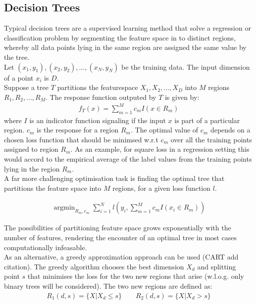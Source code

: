 \documentclass[a4paper, 11pt]{article}
\DeclareMathOperator*{\argmin}{argmin} %
\begin{document}
\subsection{Decision Trees}

Typical decision trees are a supervised learning method that solve a regression or classification problem by segmenting the feature space in to distinct regions, whereby all data points lying in the same region are assigned the same value by the tree. \\

Let ${(x_1,y_1),(x_2, y_2), \ldots, (x_N, y_N)}$ be the training data. The input dimension of a point $x_i$ is $D$.\\

Suppose a tree $T$ partitions the featurespace $X_1, X_2, \ldots, X_D$ into $M$ regions $R_1, R_2, \ldots, R_M$. The response function  outputed by $T$ is given by:
\begin{align*}
f_T(x) = \sum_{m = 1}^{M} c_m I(x \in R_m)
\end{align*}
where $I$ is an indicator function signaling if the input $x$ is part of a particular region. $c_m$ is the response for a region $R_m$. The optimal value of $c_m$ depends on a chosen loss function that should be minimsed w.r.t $c_m$ over all the training points assigned to region $R_m$. As an example, for square loss in a regression setting this would accord to the empirical average of the label values from the training points lying in the region $R_m$. \\

A far more challenging optimisation task is finding the optimal tree that partitions the feature space into $M$ regions, for a given loss function $l$.

\begin{align*}
\argmin_{R_m, c_m} \sum_{i =1}^{N} l(y_i, \sum_{m = 1}^{M} c_m I(x_i \in R_m))
\end{align*}

The possibilities of partitioning feature space grows exponentially with the number of features, rendering the encounter of an optimal tree in most cases computationally infeasable. \\

As an alternative, a greedy approximation approach can be used (CART add citation). The greedy algorithm chooses the best dimension $X_d$ and splitting point $s$ that minimises the loss for the two new regions that arise (w.l.o.g. only binary trees will be considered). The two new regions are defined as:
\begin{align*}
R_1(d, s) = \{X | X_d \leq s\} \qquad R_2(d, s) = \{X | X_d > s \}
\end{align*}
\end{document}
